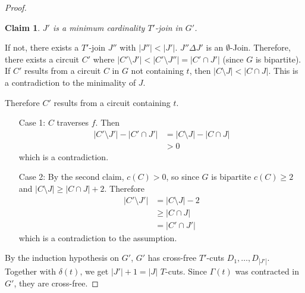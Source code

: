 \documentclass[11pt, a4paper]{article}
\newcommand{\abs}[1]{\left\lvert#1\right\rvert}
\newtheorem*{claim}{Claim}
\theoremstyle{remark}
\theoremstyle{definition}
\begin{document}
\begin{proof}
	\begin{claim}
		$J'$ is a minimum cardinality $T'$-join in $G'$.
	\end{claim}
	If not, there exists a $T'$-join $J''$ with $\abs{J''}<\abs{J'}$.
	$J''\Delta J'$ is an $\emptyset$-Join. Therefore, there exists a circuit
	$C'$ where $\abs{C'\setminus J'}<\abs{C'\setminus J''}=\abs{C'\cap J'}$ (since
	$G$ is bipartite). If $C'$ results from a circuit $C$ in $G$ not containing
	$t$, then $\abs{C\setminus J}<\abs{C\cap J}$. This is a contradiction
	to the minimality of $J$.

	Therefore $C'$ results from a circuit containing $t$.
	\begin{enumerate}
		\item[Case 1:] $C$ traverses $f$. Then
		\begin{align*}
			\abs{C'\setminus J'}-\abs{C'\cap J'} & =\abs{C\setminus J}-\abs{C\cap J} \\
			                                     & >0
		\end{align*}
		which is a contradiction.

		\item[Case 2:] By the second claim, $c(C)>0$, so since $G$ is bipartite
		$c(C)\geq2$ and $\abs{C\setminus J}\geq \abs{C\cap J}+2$. Therefore
		\begin{align*}
			\abs{C'\setminus J'} & =\abs{C\setminus J}-2 \\
			                     & \geq \abs{C\cap J}    \\
			                     & =\abs{C'\cap J'}
		\end{align*}
		which is a contradiction to the assumption.
	\end{enumerate}

	By the induction hypothesis on $G'$, $G'$ has cross-free $T'$-cuts
	$D_1,\ldots,D_{\abs{J'}}$. Together with $\delta(t)$, we get
	$\abs{J'}+1=\abs{J}$ $T$-cuts. Since $\Gamma(t)$ was contracted in
	$G'$, they are cross-free.
\end{proof}

\end{document}
